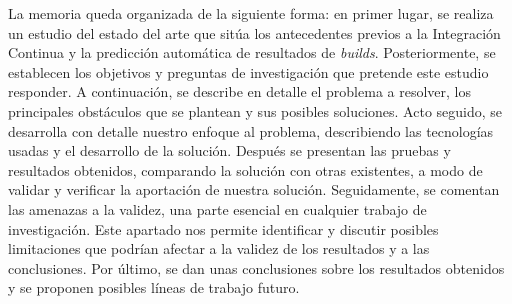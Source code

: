La memoria queda organizada de la siguiente forma: en primer lugar, se realiza un estudio del
estado del arte que sitúa los antecedentes previos a la Integración Continua y la predicción
automática de resultados de \textit{builds}. Posteriormente, se establecen los objetivos y
preguntas de investigación que pretende este estudio responder. A continuación, se describe
en detalle el problema a resolver, los principales obstáculos que se plantean y sus posibles
soluciones. Acto seguido, se desarrolla con detalle nuestro enfoque al problema, describiendo
las tecnologías usadas y el desarrollo de la solución. Después se presentan las pruebas y
resultados obtenidos, comparando la solución con otras existentes, a modo de validar y verificar
la aportación de nuestra solución. Seguidamente, se comentan las amenazas a la validez, una
parte esencial en cualquier trabajo de investigación. Este apartado nos permite identificar y
discutir posibles limitaciones que podrían afectar a la validez de los resultados y a las
conclusiones. Por último, se dan unas conclusiones sobre los resultados obtenidos y se
proponen posibles líneas de trabajo futuro.
